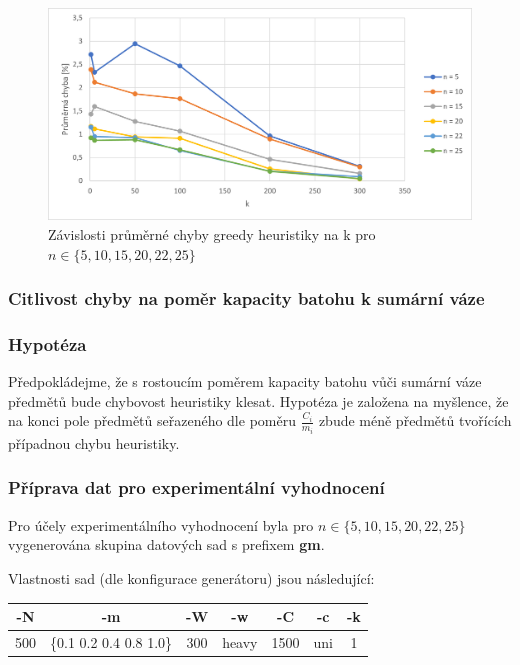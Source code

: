 \documentclass[12pt]{article}
\begin{document}
\begin{figure}[ht]\centering
    \includegraphics[width=1\textwidth, keepaspectratio]{graphs/greedy/granularity/greedy_granularity_error_k_dep.png}
    \caption{Závislosti průměrné chyby greedy heuristiky na k pro $n \in \{5, 10, 15, 20, 22, 25\}$}
    \label{fig:greedy_granularity_error_k_dep}
\end{figure}

\subsubsection{Citlivost chyby na poměr kapacity batohu k sumární váze}

\subsubsection*{Hypotéza} \label{section:greedy_sum_weight_hyp}

Předpokládejme, že s rostoucím poměrem kapacity batohu vůči sumární váze předmětů bude chybovost heuristiky klesat. Hypotéza je založena na myšlence, že na konci pole předmětů seřazeného dle poměru $\frac{C_i}{m_i}$ zbude méně předmětů tvořících případnou chybu heuristiky.

\subsubsection*{Příprava dat pro experimentální vyhodnocení}

Pro účely experimentálního vyhodnocení byla pro $n \in \{5, 10, 15, 20, 22, 25\}$ vygenerována skupina datových sad s prefixem \textbf{gm}.

Vlastnosti sad (dle konfigurace generátoru) jsou následující:

\begin{center}
    \begin{tabular}{|c | c | c | c | c | c | c|}
        \hline
        -N & -m & -W & -w & -C & -c & -k \\ [0.1ex]
        \hline\hline
        500 & \{0.1 0.2 0.4 0.8 1.0\} & 300 & heavy & 1500 & uni & 1\\
        \hline
    \end{tabular}
\end{center}
\end{document}

